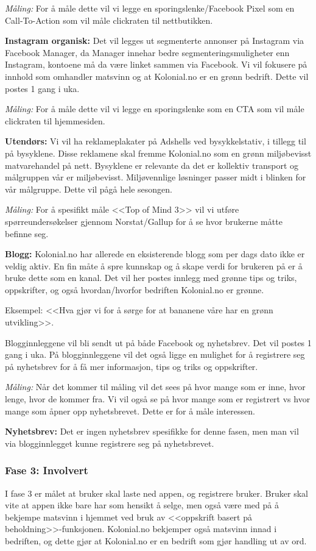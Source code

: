 \textit{Måling:} For å måle dette vil vi legge en sporingslenke/Facebook Pixel som en Call-To-Action som vil måle clickraten til nettbutikken. 

\textbf{Instagram organisk:} Det vil legges ut segmenterte annonser på Instagram via Facebook Manager, da Manager innehar bedre segmenteringsmuligheter enn Instagram, kontoene må da være linket sammen via Facebook. Vi vil fokusere på innhold som omhandler matsvinn og at Kolonial.no er en grønn bedrift. Dette vil postes 1 gang i uka. 

\textit{Måling:} For å måle dette vil vi legge en sporingslenke som en CTA som vil måle clickraten til hjemmesiden. 

\textbf{Utendørs:} Vi vil ha reklameplakater på Adshells ved bysykkelstativ, i tillegg til på bysyklene. Disse reklamene skal fremme Kolonial.no som en grønn miljøbevisst matvarehandel på nett. Bysyklene er relevante da det er kollektiv transport og målgruppen vår er miljøbevisst. Miljøvennlige løsninger passer midt i blinken for vår målgruppe. Dette vil pågå hele sesongen. 

\textit{Måling:} For å spesifikt måle <<Top of Mind 3>> vil vi utføre spørreundersøkelser gjennom Norstat/Gallup for å se hvor brukerne måtte befinne seg. 

\textbf{Blogg:} Kolonial.no har allerede en eksisterende blogg som per dags dato ikke er veldig aktiv. En fin måte å spre kunnskap og å skape verdi for brukeren på er å bruke dette som en kanal. Det vil her postes innlegg med grønne tips og triks, oppskrifter, og også hvordan/hvorfor bedriften Kolonial.no er grønne. 

Eksempel: <<Hva gjør vi for å sørge for at bananene våre har en grønn utvikling>>. 

Blogginnleggene vil bli sendt ut på både Facebook og nyhetsbrev. Det vil postes 1 gang i uka. På blogginnleggene vil det også ligge en mulighet for å registrere seg på nyhetsbrev for å få mer informasjon, tips og triks og oppskrifter. 

\textit{Måling:} Når det kommer til måling vil det sees på hvor mange som er inne, hvor lenge, hvor de kommer fra. Vi vil også se på hvor mange som er registrert vs hvor mange som åpner opp nyhetsbrevet. Dette er for å måle interessen. 

\textbf{Nyhetsbrev:} Det er ingen nyhetsbrev spesifikke for denne fasen, men man vil via blogginnlegget kunne registrere seg på nyhetsbrevet.

\subsubsection{\textbf{Fase 3: Involvert}}
I fase 3 er målet at bruker skal laste ned appen, og registrere bruker. Bruker skal vite at appen ikke bare har som hensikt å selge, men også være med på å bekjempe matsvinn i hjemmet ved bruk av <<oppskrift basert på beholdning>>-funksjonen. Kolonial.no bekjemper også matsvinn innad i bedriften, og dette gjør at Kolonial.no er en bedrift som gjør handling ut av ord. 


